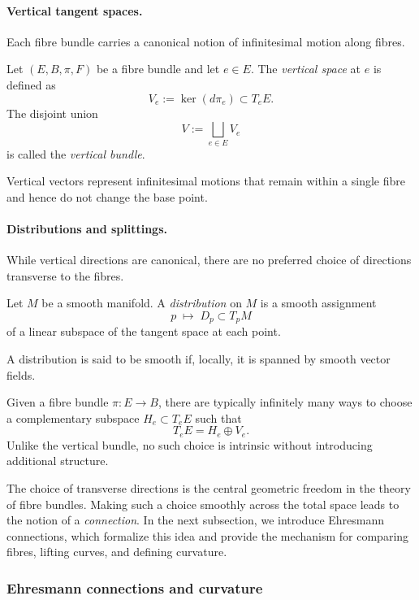 \paragraph{Vertical tangent spaces.}
Each fibre bundle carries a canonical notion of infinitesimal motion along fibres.

\begin{gdefn}
Let $(E,B,\pi,F)$ be a fibre bundle and let $e\in E$.
The \emph{vertical space} at $e$ is defined as
\[
V_e := \ker(d\pi_e) \subset T_eE.
\]
The disjoint union
\[
V := \bigsqcup_{e\in E} V_e
\]
is called the \emph{vertical bundle}.
\end{gdefn}

Vertical vectors represent infinitesimal motions that remain within a single fibre and
hence do not change the base point.

\paragraph{Distributions and splittings.}
While vertical directions are canonical, there are no preferred choice of
directions transverse to the fibres.

\begin{gdefn}[Distribution]
Let $M$ be a smooth manifold.
A \emph{distribution} on $M$ is a smooth assignment
\[
p \;\longmapsto\; D_p \subset T_pM
\]
of a linear subspace of the tangent space at each point.
\end{gdefn}

A distribution is said to be smooth if, locally, it is spanned by smooth vector fields.

Given a fibre bundle $\pi:E\to B$, there are typically infinitely many ways to choose
a complementary subspace $H_e\subset T_eE$ such that
\[
T_eE = H_e \oplus V_e.
\]
Unlike the vertical bundle, no such choice is intrinsic without introducing additional
structure.

The choice of transverse directions is the central geometric freedom in the theory of
fibre bundles.
Making such a choice smoothly across the total space leads to the notion of a
\emph{connection}.
In the next subsection, we introduce Ehresmann connections, which formalize this idea
and provide the mechanism for comparing fibres, lifting curves, and defining curvature.

\subsubsection{Ehresmann connections and curvature}
\label{subsec:background_connections_curvature}

